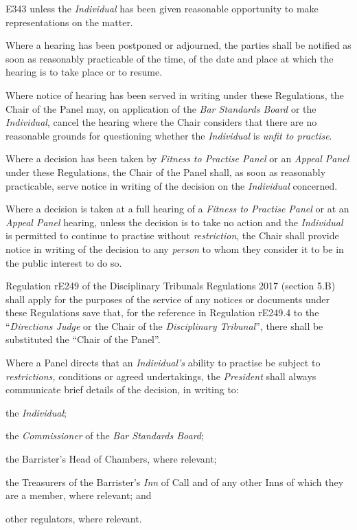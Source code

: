E343 unless the \emph{ Individual} has been given reasonable opportunity
to make representations on the matter. \\
\par
Where a hearing has been postponed or adjourned, the parties shall be
notified as soon as reasonably practicable of the time, of the date and
place at which the hearing is to take place or to resume.\\
\par
Where notice of hearing has been served in writing under these
Regulations, the Chair of the Panel may, on application of the \emph{Bar
Standards Board} or the \emph{Individual}, cancel the hearing where the
Chair considers that there are no reasonable grounds for questioning
whether the \emph{Individual} is \emph{unfit to practise}.\\
\par
{}
Where a decision has been taken by \emph{Fitness to Practise Panel} or
an \emph{Appeal Panel} under these Regulations, the Chair of the Panel
shall, as soon as reasonably practicable, serve notice in writing of the
decision on the \emph{Individual} concerned.\\
\par
Where a decision is taken at a full hearing of a \emph{Fitness to
Practise Panel} or at an \emph{Appeal Panel} hearing, unless the
decision is to take no action and the \emph{Individual} is permitted to
continue to practise without \emph{restriction}, the Chair shall provide
notice in writing of the decision to any \emph{person} to whom they
consider it to be in the public interest to do so.\\
\par
{}
Regulation rE249 of the Disciplinary Tribunals Regulations 2017 (section
5.B) shall apply for the purposes of the service of any notices or
documents under these Regulations save that, for the reference in
Regulation rE249.4 to the ``\emph{Directions Judge} or the Chair of
the \emph{Disciplinary Tribunal}'', there shall be substituted the
``Chair of the Panel''.\\
\par
Where a Panel directs that an \emph{Individual's} ability to practise be
subject to \emph{restrictions,} conditions or agreed undertakings,
the \emph{President} shall always communicate brief details of the
decision, in writing to:\\\nl \item the \emph{Individual};\item the \emph{Commissioner} of the \emph{Bar Standards Board};\item  the Barrister's Head of Chambers, where relevant;\item  the Treasurers of the Barrister's \emph{Inn} of Call and of any
other Inns of which they are a member, where relevant; and\item  other regulators, where relevant.\ln
{}

